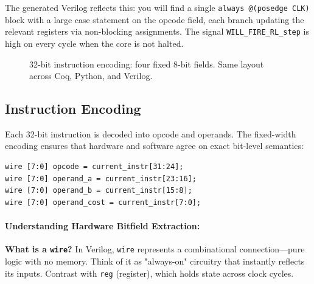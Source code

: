 The generated Verilog reflects this: you will find a single \texttt{always @(posedge CLK)} block with a large case statement on the opcode field, each branch updating the relevant registers via non-blocking assignments. The signal \texttt{WILL\_FIRE\_RL\_step} is high on every cycle when the core is not halted.


\begin{figure}[h]
\centering
{}
\caption{32-bit instruction encoding: four fixed 8-bit fields. Same layout across Coq, Python, and Verilog.}
\end{figure}

\subsection{Instruction Encoding}

Each 32-bit instruction is decoded into opcode and operands. The fixed-width encoding ensures that hardware and software agree on exact bit-level semantics:
\begin{lstlisting}
wire [7:0] opcode = current_instr[31:24];
wire [7:0] operand_a = current_instr[23:16];
wire [7:0] operand_b = current_instr[15:8];
wire [7:0] operand_cost = current_instr[7:0];
\end{lstlisting}

\paragraph{Understanding Hardware Bitfield Extraction:}
\textbf{What is a \texttt{wire}?} In Verilog, \texttt{wire} represents a combinational connection—pure logic with no memory. Think of it as "always-on" circuitry that instantly reflects its inputs. Contrast with \texttt{reg} (register), which holds state across clock cycles.

